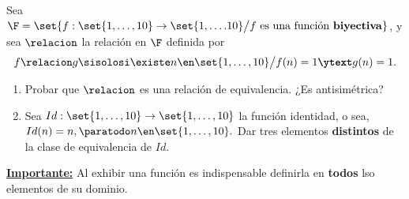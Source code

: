 \begin{enunciado}{\ejercicio}
  Sea $\F = \set{f: \set{1,\dots,10} \to \set{1,\dots.10} \big/ f \text{ es una función \textbf{biyectiva}}}$, y sea $\relacion$ la relación
  en $\F$ definida por
  $$
    f \relacion g \sisolosi \existe n \en \set{1,\dots, 10}\big/ f(n) = 1 \textbf{\ytext} g(n) = 1.
  $$
  \begin{enumerate}[label=\roman*)]
    \item Probar que $\relacion$ es una relación de equivalencia. ¿Es antisimétrica?
    \item Sea $Id: \set{1, \dots, 10} \to \set{1,\dots, 10}$ la función identidad, o sea, $Id(n) = n, \paratodo n \en \set{1,\dots, 10}.$ Dar
          tres elementos \textbf{distintos} de la clase de equivalencia de $Id$.
  \end{enumerate}

  \medskip

  \textbf{\underline{Importante:}} Al exhibir una función es indispensable definirla en \textbf{todos} lso elementos de su dominio.

\end{enunciado}

